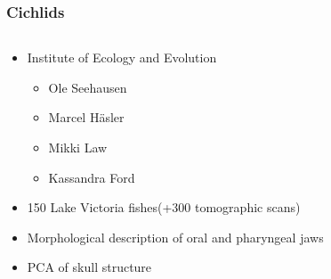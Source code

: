 \documentclass[aspectratio=169]{beamer}
\begin{document}
\begin{frame}
	\frametitle{Cichlids}
	\begin{columns}
		\begin{column}{0.495\linewidth}
			\begin{itemize}
				\item Institute of Ecology and Evolution
				\begin{itemize}%
					\item Ole Seehausen
					\item Marcel Häsler
					\item Mikki Law
					\item Kassandra Ford
				\end{itemize}
				\item 150 Lake Victoria fishes\newline (+300 tomographic scans)
				\item Morphological description of oral and pharyngeal jaws
    				\item PCA of skull structure
			\end{itemize}
		\end{column}
		\begin{column}{0.495\linewidth}
%
		\end{column}
	\end{columns}
\end{frame}
\end{document}
